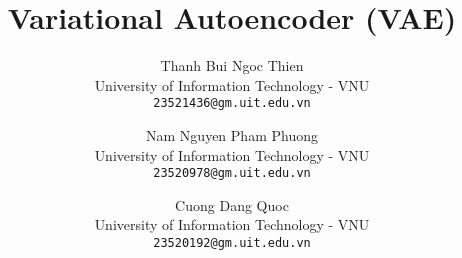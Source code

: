 \documentclass[10pt,twocolumn,letterpaper]{article}
\title{Variational Autoencoder (VAE)}
\author{
    Thanh Bui Ngoc Thien \\
    University of Information Technology - VNU \\
    {\tt\small 23521436@gm.uit.edu.vn}
    \and
    Nam Nguyen Pham Phuong \\
    University of Information Technology - VNU \\
    {\tt\small 23520978@gm.uit.edu.vn}
    \and
    Cuong Dang Quoc \\
    University of Information Technology - VNU \\
    {\tt\small 23520192@gm.uit.edu.vn}
}
\begin{document}
\maketitle
    







{
    \small
    
    
}

% 
\end{document}
